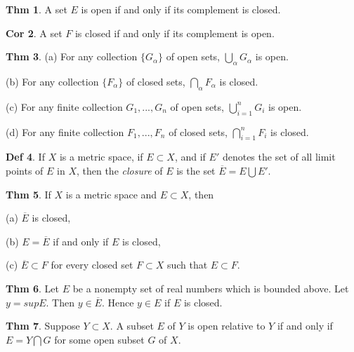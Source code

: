 \documentclass{article}
\theoremstyle{definition}
\newtheorem{definition}{Def}
\newtheorem{theorem}[definition]{Thm}
\newtheorem{corollary}[definition]{Cor}
\begin{document}
\begin{theorem}
    A set $E$ is open if and only if its complement is closed.
\end{theorem}
\begin{corollary}
    A set $F$ is closed if and only if its complement is open.
\end{corollary}
\begin{theorem}
    (a) For any collection $\{G_\alpha\}$ of open sets, $\bigcup_\alpha G_\alpha$ is open.\par
    (b) For any collection $\{F_\alpha\}$ of closed sets, $\bigcap_\alpha F_\alpha$ is closed.\par
    (c) For any finite collection $G_1,...,G_n$ of open sets, $\bigcup_{i=1}^n G_i$ is open.\par
    (d) For any finite collection $F_1,...,F_n$ of closed sets, $\bigcap_{i=1}^n F_i$ is closed.
\end{theorem}
\begin{definition}
    If $X$ is a metric space, if $E\subset X$, and if $E'$ denotes the set of all limit points of $E$ in $X$, then the \textit{closure} of $E$ is the set $\overline{E}=E\bigcup E'$.
\end{definition}
\begin{theorem}
    If $X$ is a metric space and $E\subset X$, then\par
    (a) $\overline{E}$ is closed,\par
    (b) $E=\overline{E}$ if and only if $E$ is closed,\par
    (c) $\overline{E}\subset F$ for every closed set $F\subset X$ such that $E\subset F$.
\end{theorem}
\begin{theorem}
    Let $E$ be a nonempty set of real numbers which is bounded above. Let $y=supE$. Then $y\in \overline{E}$. Hence $y\in E$ if $E$ is closed.
\end{theorem}
\begin{theorem}
    Suppose $Y\subset X$. A subset $E$ of $Y$ is open relative to $Y$ if and only if $E=Y\bigcap G$ for some open subset $G$ of $X$.
\end{theorem}
\end{document}

